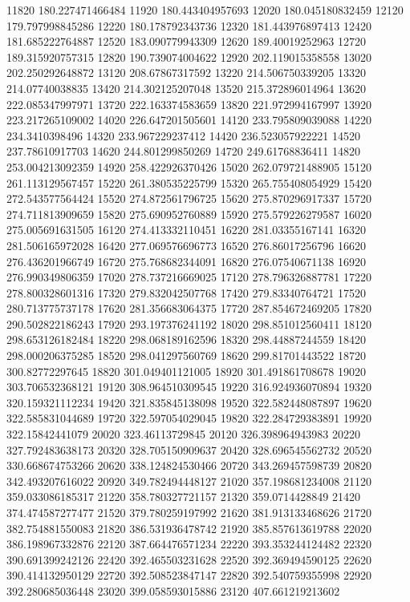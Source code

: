 {11820 180.227471466484
11920 180.443404957693
12020 180.045180832459
12120 179.797998845286
12220 180.178792343736
12320 181.443976897413
12420 181.685222764887
12520 183.090779943309
12620 189.40019252963
12720 189.315920757315
12820 190.739074004622
12920 202.119015358558
13020 202.250292648872
13120 208.67867317592
13220 214.506750339205
13320 214.07740038835
13420 214.302125207048
13520 215.372896014964
13620 222.085347997971
13720 222.163374583659
13820 221.972994167997
13920 223.217265109002
14020 226.647201505601
14120 233.795809039088
14220 234.3410398496
14320 233.967229237412
14420 236.523057922221
14520 237.78610917703
14620 244.801299850269
14720 249.61768836411
14820 253.004213092359
14920 258.422926370426
15020 262.079721488905
15120 261.113129567457
15220 261.380535225799
15320 265.755408054929
15420 272.543577564424
15520 274.872561796725
15620 275.870296917337
15720 274.711813909659
15820 275.690952760889
15920 275.579226279587
16020 275.005691631505
16120 274.413332110451
16220 281.03355167141
16320 281.506165972028
16420 277.069576696773
16520 276.86017256796
16620 276.436201966749
16720 275.768682344091
16820 276.07540671138
16920 276.990349806359
17020 278.737216669025
17120 278.796326887781
17220 278.800328601316
17320 279.832042507768
17420 279.83340764721
17520 280.713775737178
17620 281.356683064375
17720 287.854672469205
17820 290.502822186243
17920 293.197376241192
18020 298.851012560411
18120 298.653126182484
18220 298.068189162596
18320 298.44887244559
18420 298.000206375285
18520 298.041297560769
18620 299.81701443522
18720 300.82772297645
18820 301.049401121005
18920 301.491861708678
19020 303.706532368121
19120 308.964510309545
19220 316.924936070894
19320 320.159321112234
19420 321.835845138098
19520 322.582448087897
19620 322.585831044689
19720 322.597054029045
19820 322.284729383891
19920 322.15842441079
20020 323.46113729845
20120 326.398964943983
20220 327.792483638173
20320 328.705150909637
20420 328.696545562732
20520 330.668674753266
20620 338.124824530466
20720 343.269457598739
20820 342.493207616022
20920 349.782494448127
21020 357.198681234008
21120 359.033086185317
21220 358.780327721157
21320 359.0714428849
21420 374.474587277477
21520 379.780259197992
21620 381.913133468626
21720 382.754881550083
21820 386.531936478742
21920 385.857613619788
22020 386.198967332876
22120 387.664476571234
22220 393.353244124482
22320 390.691399242126
22420 392.465503231628
22520 392.369494590125
22620 390.414132950129
22720 392.508523847147
22820 392.540759355998
22920 392.280685036448
23020 399.058593015886
23120 407.661219213602
}
